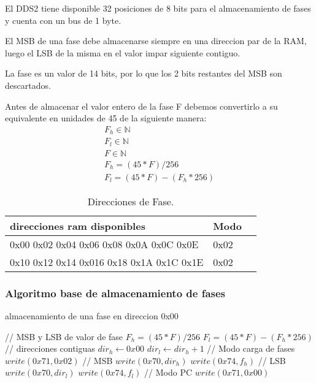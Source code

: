 El DDS2 tiene disponible 32 posiciones de 8 bits para el almacenamiento de fases
y cuenta con un bus de 1 byte.

El MSB de una fase debe almacenarse siempre en una direccion par de la RAM, luego
el LSB de la misma en el valor impar siguiente contiguo.

La fase es un valor de 14 bits, por lo que los 2 bits restantes del MSB son descartados.

Antes de almacenar el valor entero de la fase F debemos convertirlo a su equivalente
en unidades de 45 de la siguiente manera:
\begin{gather}
        F_h \in \mathbb{N} \\
        F_l \in \mathbb{N} \\
        F \in \mathbb{N} \\
        F_h = (45 * F) / 256 \\          
        F_l = (45 * F) - (F_h * 256)
\end{gather}

\begin{table}[ht]
    \centering
    \begin{tabular}{|l|l|l|}
    \hline
    direcciones ram disponibles              & Modo \\
    \hline
    0x00 0x02 0x04 0x06 0x08 0x0A 0x0C 0x0E  & 0x02 \\
    \hline
    0x10 0x12 0x14 0x016 0x18 0x1A 0x1C 0x1E & 0x02 \\
    \hline
\end{tabular}
\caption{\label{tab:tableTestCases}Direcciones de Fase.}
\end{table}

\subsubsection{Algoritmo base de almacenamiento de fases}
\begin{algorithm}[H]
    \caption{almacenamiento de una fase en direccion 0x00}\label{algo_phases}
    \begin{algorithmic}[1]
    \State // {MSB y LSB de valor de fase}
    \State $F_h = (45 * F) / 256$         
    \State $F_l = (45 * F) - (F_h * 256)$
    \State // {direcciones contiguas}
    \State $dir_h \gets 0x00$
    \State $dir_l \gets dir_h + 1$
    \State // {Modo carga de fases}
    \State $write(0x71, 0x02)$
    \State // {MSB}
    \State $write(0x70, dir_h)$ 
    \State $write(0x74, f_h)$
    \State // {LSB}
    \State $write(0x70, dir_l)$
    \State $write(0x74, f_l)$
    \State // {Modo PC}
    \State $write(0x71, 0x00)$
    \EndProcedure
    \end{algorithmic}
\end{algorithm}

